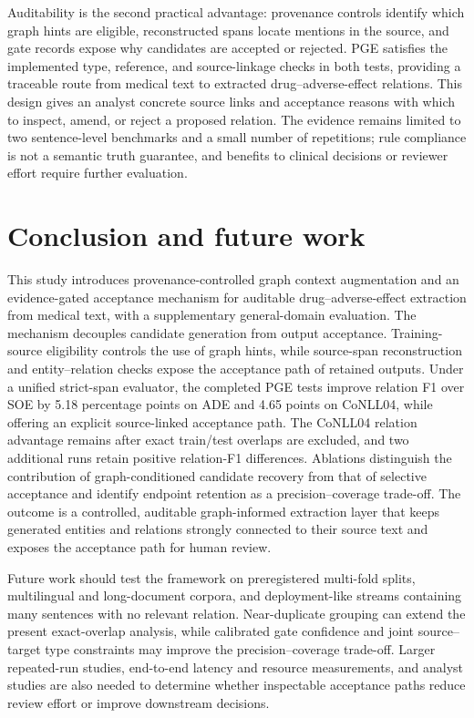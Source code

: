 \documentclass[a4paper,fleqn,numbers,doubleblind]{cas-dc}
\begin{document}
Auditability is the second practical advantage: provenance controls identify
which graph hints are eligible, reconstructed spans locate mentions in the
source, and gate records expose why candidates are accepted or rejected.
PGE satisfies the implemented type, reference, and source-linkage checks in
both tests, providing a traceable route from medical text to extracted
drug--adverse-effect relations. This design gives an analyst concrete source
links and acceptance reasons with which to inspect, amend, or reject a
proposed relation. The evidence remains limited to two sentence-level
benchmarks and a small number of repetitions; rule compliance is not a
semantic truth guarantee, and benefits to clinical decisions or reviewer
effort require further evaluation.

\section{Conclusion and future work}
\label{sec:conclusion}
This study introduces provenance-controlled graph context augmentation and an
evidence-gated acceptance mechanism for auditable drug--adverse-effect
extraction from medical text, with a supplementary general-domain evaluation.
The mechanism decouples candidate generation from output acceptance.
Training-source eligibility controls the use of graph
hints, while source-span reconstruction and entity--relation checks expose
the acceptance path of retained outputs. Under a
unified strict-span evaluator, the completed PGE tests improve relation F1
over SOE by 5.18 percentage points on ADE and 4.65 points on CoNLL04, while offering an
explicit source-linked acceptance path. The CoNLL04 relation advantage remains
after exact train/test overlaps are excluded, and two additional runs retain
positive relation-F1 differences. Ablations distinguish the contribution of
graph-conditioned candidate recovery from that of selective acceptance and
identify endpoint retention as a precision--coverage trade-off. The outcome is a
controlled, auditable graph-informed extraction layer that keeps generated
entities and relations strongly connected to their source text and exposes the
acceptance path for human review.

Future work should test the framework on preregistered multi-fold splits,
multilingual and long-document corpora, and deployment-like streams containing
many sentences with no relevant relation. Near-duplicate grouping can extend
the present exact-overlap analysis, while calibrated gate confidence and joint
source--target type constraints may improve the precision--coverage trade-off.
Larger repeated-run studies, end-to-end latency and resource measurements, and
analyst studies are also needed to determine whether inspectable acceptance
paths reduce review effort or improve downstream decisions.
\end{document}
